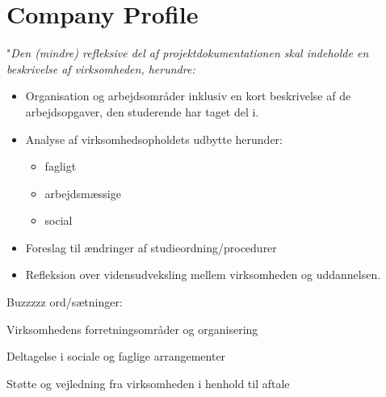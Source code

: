 \section{Company Profile} \label{company}


"\textit{Den (mindre) refleksive del af projektdokumentationen skal indeholde en beskrivelse af virksomheden, herundre:}
\begin{itemize}
	\item Organisation og arbejdsområder inklusiv en kort beskrivelse af de arbejdsopgaver, den studerende har taget del i.
	\item Analyse af virksomhedsopholdets udbytte herunder:
		\begin{itemize}
			\item fagligt
			\item arbejdsmæssige
			\item social
		\end{itemize}
	\item Foreslag til ændringer af studieordning/procedurer
	\item Refleksion over vidensudveksling mellem virksomheden og uddannelsen.
\end{itemize}

Buzzzzz ord/sætninger: 

Virksomhedens forretningsområder og organisering

Deltagelse i sociale og faglige arrangementer

Støtte og vejledning fra virksomheden i henhold til aftale
